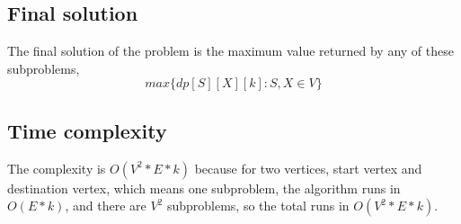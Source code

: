 \documentclass[a4paper]{article}
\begin{document}
	\subsection*{Final solution}
	The final solution of the problem is the maximum value returned by any of these subproblems,
	\[max\{dp[S][X][k]: S, X \in V\}\]
	\subsection*{Time complexity}
	The complexity is $O(V^{2}*E*k)$ because for two vertices, start vertex and destination vertex, which means one subproblem, the algorithm runs in $O(E*k)$, and there are $V^2$ subproblems, so the total runs in $O(V^{2}*E*k)$.
		
	
	
	
	
	
	
	
	
	
	
	
	
	
	
	
	
	
	
	
	
	
\end{document}
